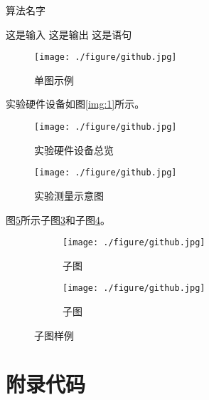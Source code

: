 \documentclass[winfonts,master,twoside,AutoFakeBold= {2}]{njuthesis}
\begin{document}
\begin{algorithm}[htbp]
  \caption{算法名字}
  \label{alg:alg1}
  \begin{algorithmic}[1]
        \REQUIRE 这是输入
        \ENSURE 这是输出
		      \STATE 这是语句
        \ENDWHILE
  \end{algorithmic}
\end{algorithm}

\begin{figure}[htbp]
  \centering
  \texttt{[image: ./figure/github.jpg]}
  \caption{单图示例}
  \label{fig:system}
\end{figure}

实验硬件设备如图\ref{img:1}所示。
\begin{figure}[htbp]
\begin{minipage}[t]{0.5\textwidth}
\centering
\texttt{[image: ./figure/github.jpg]}
\caption{实验硬件设备总览}
\label{img:1}
\end{minipage}
\begin{minipage}[t]{0.5\textwidth}
\centering
\texttt{[image: ./figure/github.jpg]}
\caption{实验测量示意图}
\label{img:2}
\end{minipage}
\end{figure}

图\ref{fig:sub}所示子图\ref{subfig:a}和子图\ref{subfig:b}。
\begin{figure}[H]
	\begin{subfigure}{.5\textwidth}
		\centering
		\texttt{[image: ./figure/github.jpg]}
		\caption{子图}
		\label{subfig:a}
	\end{subfigure}
	\begin{subfigure}{.5\textwidth}
		\centering
		\texttt{[image: ./figure/github.jpg]}
		\caption{子图}
		\label{subfig:b}
	\end{subfigure}
\caption{子图样例}
\label{fig:sub}
\end{figure}







\appendix
\chapter{附录代码}\label{app:1}
\end{document}
